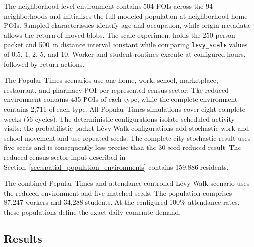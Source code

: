 The neighborhood-level environment contains 504 POIs across the 94 neighborhoods and initializes the full modeled population at neighborhood home POIs. Sampled characteristics identify age and occupation, while origin metadata allows the return of moved blobs. The scale experiment holds the 250-person packet and 500~m distance interval constant while comparing \texttt{levy\_scale} values of 0.5, 1, 2, 5, and 10. Worker and student routines execute at configured hours, followed by return actions.

The Popular Times scenarios use one home, work, school, marketplace, restaurant, and pharmacy POI per represented census sector. The reduced environment contains 435 POIs of each type, while the complete environment contains 2,711 of each type. All Popular Times simulations cover eight complete weeks (56 cycles). The deterministic configurations isolate scheduled activity visits; the probabilistic-packet L\'evy Walk configurations add stochastic work and school movement and use repeated seeds. The complete-city stochastic result uses five seeds and is consequently less precise than the 30-seed reduced result.
The reduced census-sector input described in Section~\ref{sec:spatial_population_environments} contains 159,886 residents.

The combined Popular Times and attendance-controlled L\'evy Walk scenario uses the reduced environment and five matched seeds. The population comprises 87,247 workers and 34,288 students. At the configured 100\% attendance rates, these populations define the exact daily commute demand.

\subsection{Results}
\label{sec:routine_mobility_results}

